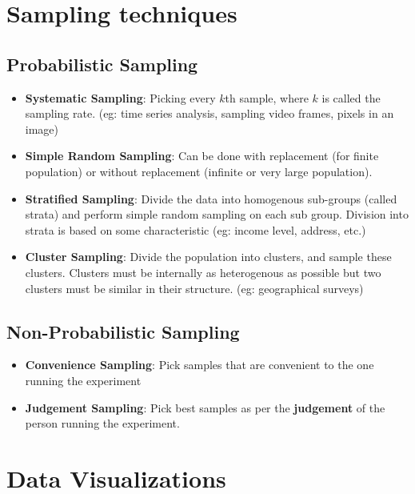 \documentclass{article}
\theoremstyle{plain}
\theoremstyle{definition}
\begin{document}
\section{Sampling techniques}
\subsection{Probabilistic Sampling}
\begin{itemize}
    \item \textbf{Systematic Sampling}: Picking every $k$th sample, where $k$ is called the sampling rate. (eg: time series analysis, sampling video frames, pixels in an image)
    
    \item \textbf{Simple Random Sampling}: Can be done with replacement (for finite population) or without replacement (infinite or very large population).
    
    \item \textbf{Stratified Sampling}: Divide the data into homogenous sub-groups (called strata) and perform simple random sampling on each sub group. Division into strata is based on some characteristic (eg: income level, address, etc.)
    
    \item \textbf{Cluster Sampling}: Divide the population into clusters, and sample these clusters. Clusters must be internally as heterogenous as possible but two clusters must be similar in their structure. (eg: geographical surveys)
\end{itemize}

\subsection{Non-Probabilistic Sampling}
\begin{itemize}
    \item \textbf{Convenience Sampling}: Pick samples that are convenient to the one running the experiment
    
    \item \textbf{Judgement Sampling}: Pick best samples as per the \textbf{judgement} of the person running the experiment. 
\end{itemize}

\section{Data Visualizations}
\end{document}
